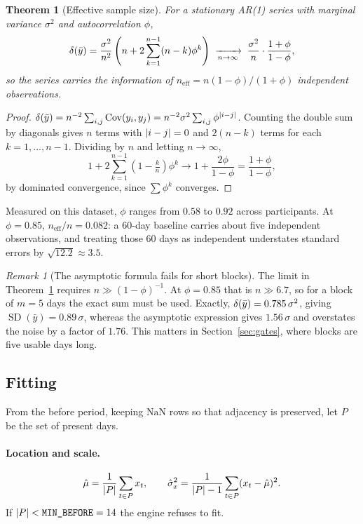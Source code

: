 \documentclass{article}
\theoremstyle{plain}
\newtheorem{theorem}{Theorem}[section]
\theoremstyle{definition}
\theoremstyle{remark}
\newtheorem{remark}{Remark}[section]
\numberwithin{equation}{section}
\begin{document}
\begin{theorem}[Effective sample size]
\label{thm:neff}
For a stationary AR(1) series with marginal variance $\sigma^2$ and
autocorrelation $\phi$,
\[
  \var(\bar y)
  = \frac{\sigma^2}{n^2}\left(n + 2\sum_{k=1}^{n-1}(n-k)\phi^k\right)
  \;\xrightarrow[n \to \infty]{}\;
  \frac{\sigma^2}{n}\cdot\frac{1+\phi}{1-\phi},
\]
so the series carries the information of
$n_{\mathrm{eff}} = n(1-\phi)/(1+\phi)$ independent observations.
\end{theorem}

\begin{proof}
$\var(\bar y) = n^{-2}\sum_{i,j}\operatorname{Cov}(y_i,y_j)
= n^{-2}\sigma^2\sum_{i,j}\phi^{\abs{i-j}}$. Counting the double sum by
diagonals gives $n$ terms with $\abs{i-j}=0$ and $2(n-k)$ terms for each
$k = 1,\dots,n-1$. Dividing by $n$ and letting $n \to \infty$,
\[
  1 + 2\sum_{k=1}^{n-1}\left(1-\tfrac{k}{n}\right)\phi^k
  \longrightarrow 1 + \frac{2\phi}{1-\phi} = \frac{1+\phi}{1-\phi},
\]
by dominated convergence, since $\sum\phi^k$ converges.
\end{proof}

Measured on this dataset, $\phi$ ranges from $0.58$ to $0.92$ across
participants. At $\phi = 0.85$, $n_{\mathrm{eff}}/n = 0.082$: a 60-day
baseline carries about five independent observations, and treating those 60
days as independent understates standard errors by $\sqrt{12.2} \approx 3.5$.

\begin{remark}[The asymptotic formula fails for short blocks]
\label{rem:short}
The limit in Theorem~\ref{thm:neff} requires $n \gg (1-\phi)^{-1}$. At
$\phi = 0.85$ that is $n \gg 6.7$, so for a block of $m=5$ days the exact sum
must be used. Exactly, $\var(\bar y) = 0.785\,\sigma^2$, giving
$\operatorname{SD}(\bar y) = 0.89\,\sigma$, whereas the asymptotic expression
gives $1.56\,\sigma$ and overstates the noise by a factor of $1.76$. This
matters in Section~\ref{sec:gates}, where blocks are five usable days long.
\end{remark}

\subsection{Fitting}

From the before period, keeping $\mathrm{NaN}$ rows so that adjacency is
preserved, let $P$ be the set of present days.

\paragraph{Location and scale.}
\[
  \hat\mu = \frac{1}{\abs{P}}\sum_{t \in P} x_t,
  \qquad
  \hat\sigma_x^2 = \frac{1}{\abs{P}-1}\sum_{t \in P}(x_t - \hat\mu)^2 .
\]
If $\abs{P} < \texttt{MIN\_BEFORE} = 14$ the engine refuses to fit.
\end{document}

